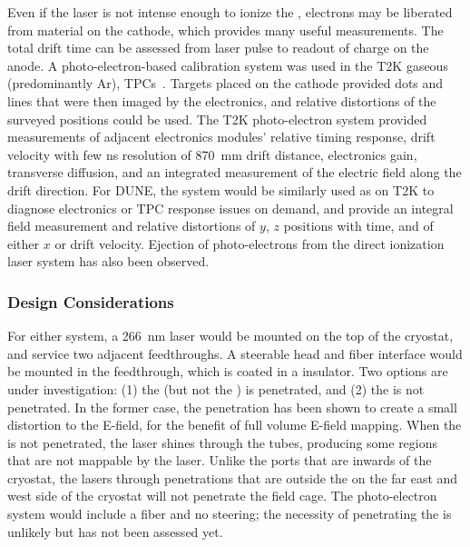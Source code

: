 Even if the laser is not intense enough to ionize the , electrons may be liberated from material on the cathode, which provides many useful measurements. The total drift time can be  assessed from laser pulse to readout of charge on the anode. A photo-electron-based calibration system was used in the T2K gaseous (predominantly Ar), TPCs~\cite{Abgrall:2010hi}. Targets placed on the cathode provided dots and lines that were then imaged by the electronics, and relative distortions of the surveyed positions could be used. The T2K photo-electron system provided measurements of adjacent electronics modules' relative timing response, drift velocity with few \si{\nano\s} resolution of \SI{870}{\milli\m} drift distance, electronics gain, transverse diffusion, and an integrated measurement of the electric field along the drift direction. For DUNE, the system would be similarly used as on T2K to diagnose electronics or TPC response issues on demand, and provide an integral field measurement and relative distortions of $y$, $z$ positions with time, and of either $x$ or drift velocity. Ejection of photo-electrons from the direct ionization laser system has also been observed.

\subsubsection{Design Considerations}

For either system, a \SI{266}{\nano\m} laser would be mounted on the top of the cryostat, and service two adjacent feedthroughs. A steerable head and fiber interface would be mounted in the feedthrough, which is coated in a insulator. Two options are under investigation: (1) the  (but not the ) is penetrated, and (2) the  is not penetrated. In the former case, the  penetration has been shown to create a small distortion to the E-field, for the benefit of full volume E-field mapping. When the  is not penetrated, the laser shines through the  tubes, producing some regions that are not mappable by the laser. Unlike the ports that are inwards of the cryostat, the lasers through penetrations that are outside the  on the far east and west side of the cryostat will not penetrate the field cage. The photo-electron system would include a fiber and no steering; the necessity of penetrating the  is unlikely but has not been assessed yet.

